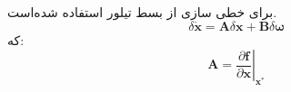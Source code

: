 برای خطی سازی از بسط تیلور استفاده شده‌‌است.
\begin{equation}
	\delta \dot{\boldsymbol{x}} = \boldsymbol A\delta \boldsymbol x + \boldsymbol B \delta \boldsymbol \omega 
\end{equation}
که:
\begin{equation}
	\boldsymbol A = \left.\dfrac{\partial \boldsymbol f}{\partial  \boldsymbol x}\right\vert_{\boldsymbol{x^*}} 
\end{equation}
